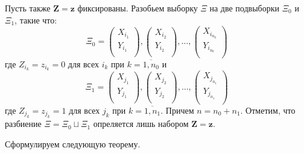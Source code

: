 Пусть также $\mathbf{Z}=\mathbf{z}$ фиксированы. 
Разобьем выборку $\Xi$ на две подвыборки $\Xi_0$ и $\Xi_1$, 
такие что:
$$
\Xi_0=
\begin{pmatrix}
    X_{i_1} \\
    Y_{i_1} \\
\end{pmatrix},
\begin{pmatrix}
    X_{i_2} \\
    Y_{i_2} \\
\end{pmatrix}, \ldots,
\begin{pmatrix}
    X_{i_{n_0}} \\
    Y_{i_{n_0}} \\
\end{pmatrix} 
$$
где $Z_{i_k}=z_{i_k}=0$ для всех $i_k$ при $k=\overline{1,n_0}$ и $$
\Xi_1=
\begin{pmatrix}
    X_{j_1} \\
    Y_{j_1} \\
\end{pmatrix},
\begin{pmatrix}
    X_{j_2} \\
    Y_{j_2} \\
\end{pmatrix}, \ldots,
\begin{pmatrix}
    X_{j_{n_1}} \\
    Y_{j_{n_1}} \\
\end{pmatrix} 
$$
где $Z_{j_k}=z_{j_k}=1$ для всех $j_k$ при $k=\overline{1,n_1}$. 
Причем $n=n_0+n_1$. Отметим, что
разбиение $\Xi = \Xi_0 \sqcup \Xi_1$ опреляется лишь набором
$\mathbf{Z}=\mathbf{z}$.

Сформулируем следующую теорему.

